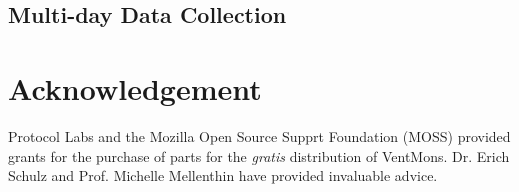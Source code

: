 \documentclass{article}
\begin{document}
\subsection{Multi-day Data Collection}

\section*{Acknowledgement}

Protocol Labs and the Mozilla Open Source Supprt Foundation (MOSS) provided
grants for the purchase of parts for the {\it gratis} distribution of VentMons.
Dr. Erich Schulz and Prof. Michelle Mellenthin have provided invaluable advice.





\end{document}
